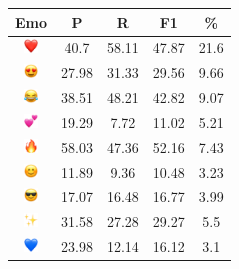 \documentclass{article}
\begin{document}
\begin{table}
\centering
\begin{tabular}{|c|ccc|c|} \hline
\textbf{Emo} & \textbf{P} & \textbf{R} & \textbf{F1} & \textbf{\%} \\ \hline
\includegraphics[height=0.37cm,width=0.37cm]{img/red_heart.png} & 40.7 & 58.11 & 47.87 & 21.6\\ 
\includegraphics[height=0.37cm,width=0.37cm]{img/smiling_face_with_hearteyes.png} & 27.98 & 31.33 & 29.56 & 9.66\\ 
\includegraphics[height=0.37cm,width=0.37cm]{img/face_with_tears_of_joy.png} & 38.51 & 48.21 & 42.82 & 9.07\\ 
\includegraphics[height=0.37cm,width=0.37cm]{img/two_hearts.png} & 19.29 & 7.72 & 11.02 & 5.21\\ 
\includegraphics[height=0.37cm,width=0.37cm]{img/fire.png} & 58.03 & 47.36 & 52.16 & 7.43\\ 
\includegraphics[height=0.37cm,width=0.37cm]{img/smiling_face_with_smiling_eyes.png} & 11.89 & 9.36 & 10.48 & 3.23\\ 
\includegraphics[height=0.37cm,width=0.37cm]{img/smiling_face_with_sunglasses.png} & 17.07 & 16.48 & 16.77 & 3.99\\ 
\includegraphics[height=0.37cm,width=0.37cm]{img/sparkles.png} & 31.58 & 27.28 & 29.27 & 5.5\\ 
\includegraphics[height=0.37cm,width=0.37cm]{img/blue_heart.png} & 23.98 & 12.14 & 16.12 & 3.1\\ 

\end{tabular}
\end{table}
\end{document}
